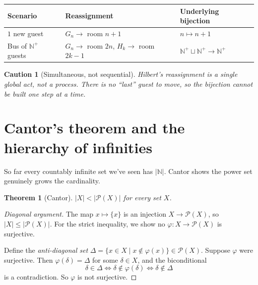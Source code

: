 \documentclass[11pt]{article}
\theoremstyle{defstyle}
\theoremstyle{thmstyle}
\newtheorem{theorem}{Theorem}[section]
\theoremstyle{notstyle}
\theoremstyle{cautionstyle}
\newtheorem*{caution}{Caution}
\newcommand{\N}{\mathbb{N}}
\newcommand{\Np}{\mathbb{N}^{+}}
\newcommand{\card}[1]{\lvert #1 \rvert}
\newcommand{\Pow}{\mathcal{P}}
\begin{document}
\begin{center}
\renewcommand{\arraystretch}{1.5}
\begin{tabular}{|l|l|l|}
\hline
\textbf{Scenario} & \textbf{Reassignment} & \textbf{Underlying bijection} \\
\hline
$1$ new guest      & $G_n \to$ room $n+1$
                   & $n \mapsto n+1$ \\
Bus of $\Np$ guests & $G_n \to$ room $2n$,\; $H_k \to$ room $2k-1$
                   & $\Np \sqcup \Np \to \Np$ \\
\hline
\end{tabular}
\end{center}

\begin{cautionbox}
\begin{caution}[Simultaneous, not sequential]
Hilbert's reassignment is a single global act, not a process.  There is no
``last'' guest to move, so the bijection cannot be built one step at a time.
\end{caution}
\end{cautionbox}

\section{Cantor's theorem and the hierarchy of infinities}

So far every countably infinite set we've seen has $\card{\N}$.  Cantor
shows the power set genuinely grows the cardinality.

\begin{thmbox}
\begin{theorem}[Cantor]
$\card{X} < \card{\Pow(X)}$ for every set $X$.
\end{theorem}
\begin{proof}[Diagonal argument]
The map $x \mapsto \{x\}$ is an injection $X \to \Pow(X)$, so
$\card{X} \leq \card{\Pow(X)}$.  For the strict inequality, we show no
$\varphi \colon X \to \Pow(X)$ is surjective.

Define the \emph{anti-diagonal set}
\(
  \Delta = \{x \in X \mid x \notin \varphi(x)\} \in \Pow(X).
\)
Suppose $\varphi$ were surjective.  Then $\varphi(\delta) = \Delta$ for
some $\delta \in X$, and the biconditional
\[
  \delta \in \Delta
  \iff \delta \notin \varphi(\delta)
  \iff \delta \notin \Delta
\]
is a contradiction.  So $\varphi$ is not surjective.
\end{proof}
\end{thmbox}
\end{document}
